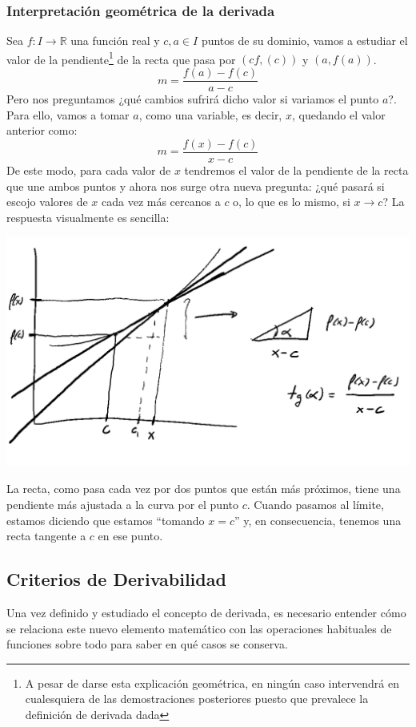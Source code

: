 \documentclass[10pt,a4paper,openright]{book}
\theoremstyle{break}
\begin{document}
\subsubsection{Interpretación geométrica de la derivada}
Sea $f:I \rightarrow \mathbb R$ una función real y $c,a\in I$ puntos de su dominio, vamos a estudiar el valor de la pendiente\footnote{A pesar de darse esta explicación geométrica, en ningún caso intervendrá en cualesquiera de las demostraciones posteriores puesto que prevalece la definición de derivada dada} de la recta que pasa por $(cf,(c))$ y $(a,f(a))$.
$$m = \frac{f(a)-f(c)}{a-c}$$
Pero nos preguntamos ¿qué cambios sufrirá dicho valor si variamos el punto $a$?. Para ello, vamos a tomar $a$, como una variable, es decir, $x$, quedando el valor anterior como:
$$m = \frac{f(x)-f(c)}{x-c}$$
De este modo, para cada valor de $x$ tendremos el valor de la pendiente de la recta que une ambos puntos y ahora nos surge otra nueva pregunta: ¿qué pasará si escojo valores de $x$ cada vez más cercanos a $c$ o, lo que es lo mismo, si $x\rightarrow c$? La respuesta visualmente es sencilla:

\begin{center}
\includegraphics[scale=0.64]{Interpretacion derivada}
\end{center}

La recta, como pasa cada vez por dos puntos que están más próximos, tiene una pendiente más ajustada a la curva por el punto $c$. Cuando pasamos al límite, estamos diciendo que estamos ``tomando $x=c$'' y, en consecuencia, tenemos una recta tangente a $c$ en ese punto.

\subsection{Criterios de Derivabilidad}
Una vez definido y estudiado el concepto de derivada, es necesario entender cómo se relaciona este nuevo elemento matemático con las operaciones habituales de funciones sobre todo para saber en qué casos se conserva.
\end{document}
